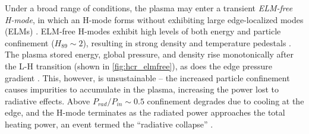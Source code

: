 \begin{figure}[t]
 \pushtooutside
\end{figure}

Under a broad range of conditions, the plasma may enter a transient \emph{ELM-free H-mode}, in which an H-mode forms without exhibiting large edge-localized modes (ELMs) \cite{Zohm1996,Suttrop2000a}.  ELM-free H-modes exhibit high levels of both energy and particle confinement ($H_{89} \sim 2$), resulting in strong density and temperature pedestals \cite{Hubbard2000,Hatae1998}.  The plasma stored energy, global pressure, and density rise monotonically after the L-H transition (shown in \cref{fig:hcr_elmfree}), as does the edge pressure gradient \cite{Breger1998}.  This, however, is unsustainable -- the increased particle confinement causes impurities to accumulate in the plasma, increasing the power lost to radiative effects.  Above $P_{rad}/P_{in} \sim 0.5$ confinement degrades due to cooling at the edge, and the H-mode terminates as the radiated power approaches the total heating power, an event termed the ``radiative collapse'' \cite{Greenwald1997}.

